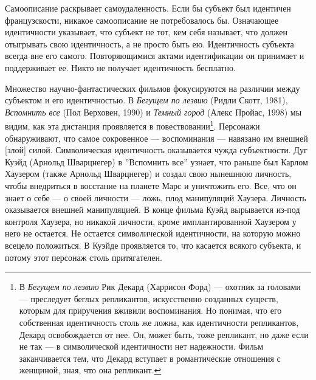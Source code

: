 \documentclass[12pt]{book}
\begin{document}
Самоописание раскрывает самоудаленность. Если бы субъект был идентичен французскости, никакое самоописание не потребовалось бы. Означающее идентичности указывает, что субъект не тот, кем себя называет, что должен отыгрывать свою идентичность, а не просто быть ею. Идентичность субъекта всегда вне его самого. Повторяющимися актами идентификации он принимает и поддерживает ее. Никто не получает идентичность бесплатно.

Множество научно-фантастических фильмов фокусируются на различии между субъектом и его идентичностью. В \textit{Бегущем по лезвию} (Ридли Скотт, 1981), \textit{Вспомнить все} (Пол Верховен, 1990) и \textit{Темный город} (Алекс Пройас, 1998) мы видим, как эта дистанция проявляется в повествовании\footnote{В \textit{Бегущем по лезвию} Рик Декард (Харрисон Форд) --- охотник за головами --- преследует беглых репликантов, искусственно созданных существ, которым для приручения вживили воспоминания. Но понимая, что его собственная идентичность столь же ложна, как идентичности репликантов, Декард освобождается от нее. Он, может быть, тоже репликант, но даже если не так --- в символической идентичности нет надежности. Фильм заканчивается тем, что Декард вступает в романтические отношения с женщиной, зная, что она репликант.}. Персонажи обнаруживают, что самое сокровенное --- воспоминания --- навязано им внешней [злой] силой. Символическая идентичность оказывается чужда субъектности. Дуг Куэйд (Арнольд Шварцнегер) в ''Вспомнить все'' узнает, что раньше был Карлом Хаузером (также Арнольд Шварцнегер) и создал свою нынешнюю личность, чтобы внедриться в восстание на планете Марс и уничтожить его. Все, что он знает о себе --- о своей личности --- ложь, плод манипуляций Хаузера. Личность оказывается внешней манипуляцией. В конце фильма Куэйд вырывается из-под контроля Хаузера, но никакой личности, кроме имплантированной Хаузером у него не остается. Не остается символической идентичности, на которую можно всецело положиться. В Куэйде проявляется то, что касается всякого субъекта, и потому этот персонаж столь притягателен.
\end{document}
